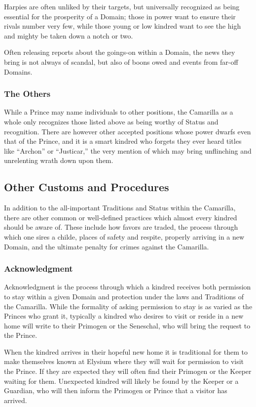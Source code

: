 Harpies are often unliked by their targets, but universally recognized as being essential for the 
prosperity of a Domain; those in power want to ensure their rivals number very few, while those 
young or low kindred want to see the high and mighty be taken down a notch or two.

Often releasing reports about the goings-on within a Domain, the news they bring is not always of 
scandal, but also of boons owed and events from far-off Domains.

\subsubsection{The Others}
While a Prince may name individuals to other positions, the Camarilla as a whole only recognizes 
those listed above as being worthy of Status and recognition.  There are however other accepted 
positions whose power dwarfs even that of the Prince, and it is a smart kindred who forgets they 
ever heard titles like ``Archon'' or ``Justicar,'' the very mention of which may bring unflinching 
and unrelenting wrath down upon them.

\subsection{Other Customs and Procedures}
In addition to the all-important Traditions and Status within the Camarilla, there are other 
common or well-defined practices which almost every kindred should be aware of.  These include 
how favors are traded, the process through which one sires a childe, places of safety and respite, 
properly arriving in a new Domain, and the ultimate penalty for crimes against the Camarilla.

\subsubsection{Acknowledgment}
Acknowledgment is the process through which a kindred receives both permission to 
stay within a given Domain and protection under the laws and Traditions of the 
Camarilla.  While the formality of asking permission to stay is as varied as the 
Princes who grant it, typically a kindred who desires to visit or reside in a new 
home will write to their Primogen or the Seneschal, who will bring the request 
to the Prince.

When the kindred arrives in their hopeful new home it is traditional for them to 
make themselves known at Elysium where they will wait for permission to visit the 
Prince.  If they are expected they will often find their Primogen or the Keeper 
waiting for them.  Unexpected kindred will likely be found by the Keeper or a 
Guardian, who will then inform the Primogen or Prince that a visitor has arrived.

